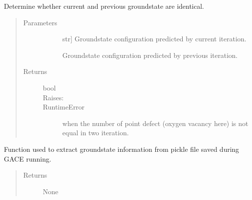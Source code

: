 \documentclass[letterpaper,10pt,english]{sphinxmanual}
\begin{document}
\begin{fulllineitems}
\begin{fulllineitems}
\label{\detokenize{pygace:pygace.general_gace.Runner.compare_gs}}
\sphinxAtStartPar
Determine whether current and previous ground\sphinxhyphen{}state are identical.
\begin{quote}\begin{description}
\item[{Parameters}] \leavevmode\begin{description}
\item[{}] \leavevmode{[}str{]}
\sphinxAtStartPar
Ground\sphinxhyphen{}state configuration predicted by current iteration.

\item[{}] \leavevmode
\sphinxAtStartPar
Ground\sphinxhyphen{}state configuration predicted by previous iteration.

\end{description}

\item[{Returns}] \leavevmode\begin{description}
\item[{bool}] \leavevmode
\item[{Raises:}] \leavevmode
\item[{RuntimeError}] \leavevmode
\sphinxAtStartPar
when the number of point defect (oxygen vacancy here) is not equal
in two iteration.

\end{description}

\end{description}\end{quote}

\end{fulllineitems}


\begin{fulllineitems}
\label{\detokenize{pygace:pygace.general_gace.Runner.print_gs}}
\sphinxAtStartPar
Function used to extract ground\sphinxhyphen{}state information from pickle file
saved during GACE running.
\begin{quote}\begin{description}
\item[{Returns}] \leavevmode\begin{description}
\item[{None}] \leavevmode
\end{description}


\end{description}
\end{quote}
\end{fulllineitems}
\end{fulllineitems}
\end{document}
